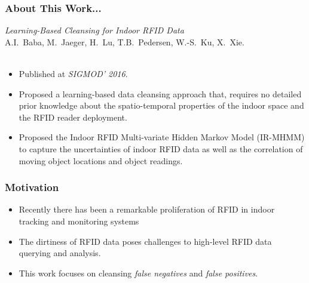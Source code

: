 \begin{frame}
\frametitle{About This Work...}

\emph{Learning-Based Cleansing for Indoor RFID Data}~\cite{baba2016learning}\\
A.I.~Baba, M.~Jaeger, H.~Lu, T.B.~Pedersen, W.-S.~Ku, X.~Xie.\\~\\

\begin{itemize}
  \item Published at \emph{SIGMOD' 2016}.
  \item Proposed a learning-based data cleansing approach that, requires no detailed prior knowledge about the spatio-temporal properties of the indoor space and the RFID reader deployment.
  \item Proposed the Indoor RFID Multi-variate Hidden Markov Model (IR-MHMM) to capture the uncertainties of indoor RFID data as well as the correlation of moving object locations and object readings.
\end{itemize}

\end{frame}


\begin{frame}
\frametitle{Motivation}

\begin{itemize}
  \item Recently there has been a remarkable proliferation of RFID in indoor tracking and monitoring systems
  \item The dirtiness of RFID data poses challenges to high-level RFID data querying and analysis.~\cite{chen2010leveraging}
  \item This work focuses on cleansing \emph{false negatives} and \emph{false positives}.
\end{itemize}

\end{frame}

